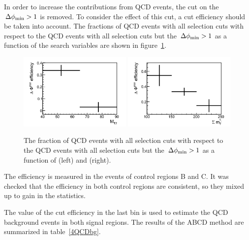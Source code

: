 In order to increase the contributions from QCD events, the cut on the $\,{\Delta\phi_{\rm min}}>1$ is removed.
To consider the effect of this cut, a cut efficiency should be taken into account. The 
fractions of QCD events with all selection cuts with respect to the QCD events with all selection 
cuts but the $\,{\Delta\phi_{\rm min}}>1$ as a function of the search variables are shown in figure~\ref{fig:3QCDbg}.\\
\begin{figure}[!Hhtb]
\centering
\includegraphics[width=0.49\textwidth]{QCDbginTauTau/Bin1-efficiency.png}
\includegraphics[width=0.49\textwidth]{QCDbginTauTau/Bin2-efficiency.png} \\
\caption{ The fraction of QCD events with all selection cuts with respect to the QCD events with all selection 
cuts but the $\,{\Delta\phi_{\rm min}}>1$ as a function of \mttwo (left) and \SumMT (right).}
\label{fig:3QCDbg}
\end{figure}
The efficiency is measured in the events of control regions B and C. It was checked that the efficiency in both control regions are consistent, 
so they mixed up to gain in the statistics. 
 

The value of the cut efficiency 
in the last bin is used to estimate the 
QCD background events in both signal regions. %
The results of the ABCD method are summarized in table~\ref{4QCDbg}.\\

